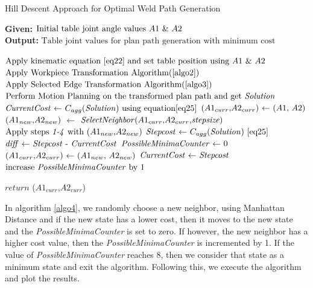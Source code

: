 \begin{algorithm}
	\caption{Hill Descent Approach for Optimal Weld Path Generation}
	\label{algo4}
	\textbf{Given:} $ \text{Initial table joint angle values \textit{$A1$} \& \textit{$A2$}}$ \\ 
	\textbf{Output:} $ \text{Table joint values for plan path generation with minimum cost}$ \\
	
	\begin{algorithmic}[1]
		\State $\text{Apply kinematic equation \ref{eq22} and set table position using \textit{$A1$} \& \textit{$A2$}}$
		\State $\text{Apply Workpiece Transformation Algorithm(\ref{algo2})}$
		\State $\text{Apply Selected Edge Transformation Algorithm(\ref{algo3})}$
		\State $\text{Perform Motion Planning on the transformed plan path and get \textit{Solution}}$
		\State $\text{\textit{CurrentCost} $\gets$ $C_{agg}$(\textit{Solution}) using equation\ref{eq25}}$
		\State $\text{(\textit{$A1_{curr}$},\textit{$A2_{curr}$}) $\gets$ (\textit{$A1$}, \textit{$A2$})}$
		\Do
		\State $\text{(\textit{$A1_{new}$},\textit{$A2_{new}$})}$ $\gets$ $\text{\textit{SelectNeighbor}(\textit{$A1_{curr}$},\textit{$A2_{curr}$},\textit{stepsize})}$
		\State $\text{Apply steps \textit{1-4} with (\textit{$A1_{new}$},\textit{$A2_{new}$})}$
		\State $\text{\textit{Stepcost} $\gets$ $C_{agg}$(\textit{Solution}) \ref{eq25}}$
		\State $\text{\textit{diff} $\gets$ \textit{Stepcost} - \textit{CurrentCost}}$
		\If {[${diff < 0}$]}
		\State $\text{\textit{PossibleMinimaCounter} $\gets$ 0}$
		\State $\text{(\textit{$A1_{curr}$},\textit{$A2_{curr}$}) $\gets$ (\textit{$A1_{new}$}, \textit{$A2_{new}$})}$
		\State $\text{\textit{CurrentCost} $\gets$ \textit{Stepcost}}$
		\Else
		\State $\text{increase \textit{PossibleMinimaCounter} by 1}$
		\EndIf  
		
		\State $\textit{return}$ ($\textit{$A1_{curr}$}$,$\textit{$A2_{curr}$}$)     
	\end{algorithmic}
\end{algorithm}
In algorithm \ref{algo4}, we randomly choose a new neighbor, using Manhattan Distance and if the new state has a lower cost, then it moves to the new state and the \textit{PossibleMinimaCounter} is set to zero. If however, the new neighbor has a higher cost value, then the \textit{PossibleMinimaCounter} is incremented by 1. If the value of \textit{PossibleMinimaCounter} reaches 8, then we consider that state as a minimum state and exit the algorithm. Following this, we execute the algorithm and plot the results.

